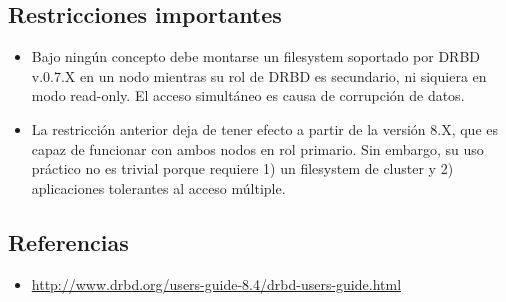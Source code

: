 \subsection{Restricciones importantes}
\begin{itemize}
	\item Bajo ningún concepto debe montarse un filesystem soportado por DRBD v.0.7.X en un nodo mientras su rol de DRBD es secundario, ni siquiera en modo read-only. El acceso simultáneo es causa de corrupción de datos. 
	\item La restricción anterior deja de tener efecto a partir de la versión 8.X, que es capaz de funcionar con ambos nodos en rol primario. Sin embargo, su uso práctico no es trivial porque requiere 1) un filesystem de cluster y 2) aplicaciones tolerantes al acceso múltiple.
\end{itemize} 


\subsection{Referencias}

\begin{itemize}
	\item \url{http://www.drbd.org/users-guide-8.4/drbd-users-guide.html}
\end{itemize}



